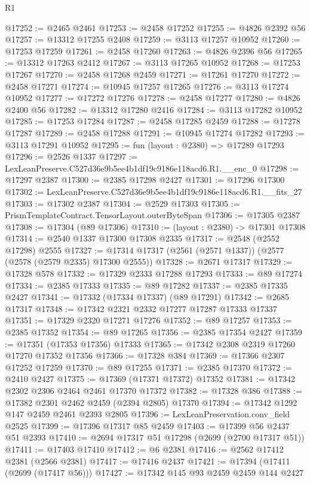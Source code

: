 \begin{lexlean}{R1}
\begin{coremodule}
@17252 := @2465 @2461
@17253 := @2458 @17252
@17255 := @4826 @2392 @56
@17257 := @13312 @17255 @2408
@17259 := @3113 @17257 @10952
@17260 := @17253 @17259
@17261 := @2458 @17260
@17263 := @4826 @2396 @56
@17265 := @13312 @17263 @2412
@17267 := @3113 @17265 @10952
@17268 := @17253 @17267
@17270 := @2458 @17268 @2459
@17271 := @17261 @17270
@17272 := @2458 @17271
@17274 := @10945 @17257 @17265
@17276 := @3113 @17274 @10952
@17277 := @17272 @17276
@17278 := @2458 @17277
@17280 := @4826 @2400 @56
@17282 := @13312 @17280 @2416
@17284 := @3113 @17282 @10952
@17285 := @17253 @17284
@17287 := @2458 @17285 @2459
@17288 := @17278 @17287
@17289 := @2458 @17288
@17291 := @10945 @17274 @17282
@17293 := @3113 @17291 @10952
@17295 := fun (layout : @2380) => @17289 @17293
@17296 := @2526 @1337
@17297 := LexLeanPreserve.C527d36e9b5ee4b1df19c9186e118acd6.R1.__enc_0
@17298 := @17297 @2387
@17300 := @2385 @17298 @2427
@17301 := @17296 @17300
@17302 := LexLeanPreserve.C527d36e9b5ee4b1df19c9186e118acd6.R1.__fits_27
@17303 := @17302 @2387
@17304 := @2529 @17303
@17305 := PrismTemplateContract.TensorLayout.outerByteSpan
@17306 := @17305 @2387
@17308 := @17304 (@89 @17306)
@17310 := (layout : @2380) -> @17301 @17308
@17314 := @2540 @1337 @17300 @17308 @2335
@17317 := @2548 (@2552 @17298) @2555
@17327 := @17314 @17317 (@2561 (@2571 @1337)) (@2577 (@2578 (@2579 @2335) @17300 @2555))
@17328 := @2671 @17317
@17329 := @17328 @578
@17332 := @17329 @2333 @17288 @17293
@17333 := @89 @17274
@17334 := @2385 @17333
@17335 := @89 @17282
@17337 := @2385 @17335 @2427
@17341 := @17332 (@17334 @17337) (@89 @17291)
@17342 := @2685 @17317
@17348 := @17342 @2321 @2332 @17277 @17287 @17333 @17337
@17351 := @17329 @2320 @17271 @17276
@17352 := @89 @17257
@17353 := @2385 @17352
@17354 := @89 @17265
@17356 := @2385 @17354 @2427
@17359 := @17351 (@17353 @17356) @17333
@17365 := @17342 @2308 @2319 @17260 @17270 @17352 @17356
@17366 := @17328 @384
@17369 := @17366 @2307 @17252 @17259
@17370 := @89 @17255
@17371 := @2385 @17370
@17372 := @2410 @2427
@17375 := @17369 (@17371 @17372) @17352
@17381 := @17342 @2302 @2306 @2464 @2461 @17370 @17372
@17382 := @17328 @386
@17388 := @17382 @2301 @2462 @2459 (@2394 @2805) @17370
@17394 := @17342 @1292 @147 @2459 @2461 @2393 @2805
@17396 := LexLeanPreservation.conv_field @2525
@17399 := @17396 @17317 @85 @2459
@17403 := @17399 @56 @2437 @51 @2393
@17410 := @2694 @17317 @51 @17298 (@2699 (@2700 @17317 @51))
@17411 := @17403 @17410
@17412 := @6 @2381
@17416 := @2562 @17412 @2381 (@2566 @2381)
@17417 := @17416 @2437
@17421 := @17394 (@17411 (@2699 (@17417 @56)))
@17427 := @17342 @145 @93 @2459 @2459 @144 @2427

\end{coremodule}
\end{lexlean}
